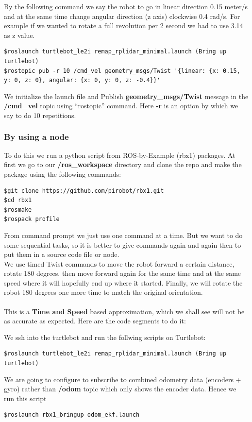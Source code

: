 \documentclass[10pt,a4paper]{article}
\begin{document}
By the following command we say the robot to go in linear direction 0.15 meter/s and at the same time change angular direction (z axis) clockwise 0.4 rad/s. For example if we wanted to rotate a full revolution per 2 second we had to use 3.14 as z value.
\begin{lstlisting}[frame=single] 
$roslaunch turtlebot_le2i remap_rplidar_minimal.launch (Bring up turtlebot)
$rostopic pub -r 10 /cmd_vel geometry_msgs/Twist '{linear: {x: 0.15, y: 0, z: 0}, angular: {x: 0, y: 0, z: -0.4}}'
\end{lstlisting}
We initialize the launch file and Publish \textbf{geometry\_msgs/Twist} message in the \textbf{/cmd\_vel} topic using ``rostopic'' command. Here \textbf{-r} is an option by which we say to do 10 repetitions.

\subsubsection{By using a node}
To do this we run a python script from ROS-by-Example (rbx1) packages. At first we go to our \textbf{/ros\_workspace} directory and clone the repo and make the package using the following commands:

\begin{lstlisting}[frame=single] 
$git clone https://github.com/pirobot/rbx1.git
$cd rbx1
$rosmake
$rospack profile
\end{lstlisting}

From command prompt we just use one command at a time. But we want to do some sequential tasks, so it is better to give commands again and again then to put them in a source code file or node. \\
We use timed Twist commands to move the robot forward a certain distance, rotate 180 degrees, then move forward again for the same time and at the same speed where it will hopefully end up where it started. Finally, we will rotate the robot 180 degrees one more time to match the original orientation.\\\\

This is a \textbf{Time and Speed} based approximation, which we shall see will not be as accurate as expected. Here are the code segments to do it:

We ssh into the turtlebot and run the follwing scripts
on Turtlebot:
\begin{lstlisting}[frame=single] 
$roslaunch turtlebot_le2i remap_rplidar_minimal.launch (Bring up turtlebot)
\end{lstlisting}
We are going to configure to subscribe to combined odometry data (encoders + gyro) 
rather than \textbf{/odom} topic which only shows the encoder data. Hence we run this script
\begin{lstlisting}[frame=single] 
$roslaunch rbx1_bringup odom_ekf.launch
\end{lstlisting}
\end{document}
